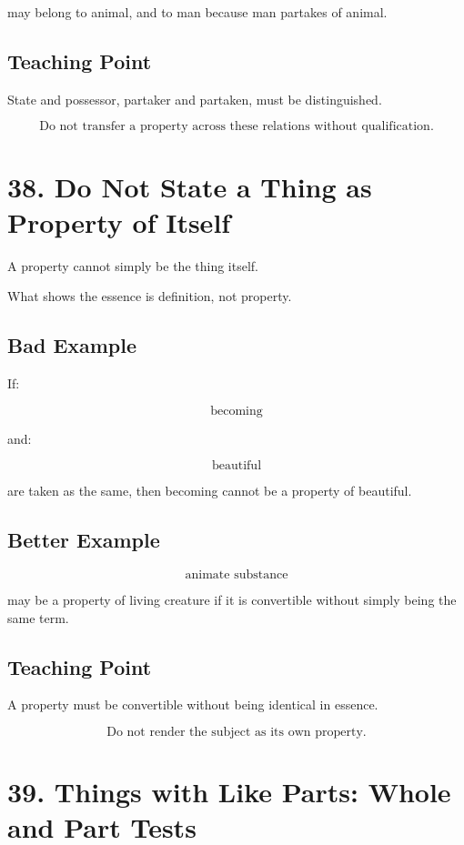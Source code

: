 \documentclass[12pt]{article}
\begin{document}
may belong to animal, and to man because man partakes of animal.

\subsection*{Teaching Point}

State and possessor, partaker and partaken, must be distinguished.

\[
\boxed{
\text{Do not transfer a property across these relations without qualification.}
}
\]

\section*{38. Do Not State a Thing as Property of Itself}

A property cannot simply be the thing itself.

What shows the essence is definition, not property.

\subsection*{Bad Example}

If:

\[
\text{becoming}
\]

and:

\[
\text{beautiful}
\]

are taken as the same, then becoming cannot be a property of beautiful.

\subsection*{Better Example}

\[
\text{animate substance}
\]

may be a property of living creature if it is convertible without simply being
the same term.

\subsection*{Teaching Point}

A property must be convertible without being identical in essence.

\[
\boxed{
\text{Do not render the subject as its own property.}
}
\]

\section*{39. Things with Like Parts: Whole and Part Tests}
\end{document}
